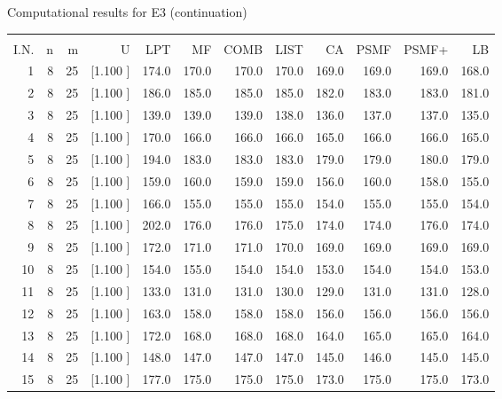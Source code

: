 \documentclass[12pt,a4paper]{article}
\begin{document}
\newpage
\begin{center}
 Computational results for E3 (continuation) {\tiny
\begin{tabular}{r r r r r r r r r r r r}\hline
    &   &   &          &        &        &        &        &        &        &        &       \\[-0.1in]
  I.N.  &  n  &  m  &  U  &  LPT  &  MF  &  COMB  &  LIST  &  CA  & PSMF &PSMF+ & LB \\[0.03in]
\hline
   1&  8& 25&[1.100     ]&   174.0&   170.0&   170.0&   170.0&   169.0&   169.0&   169.0&   168.0\\[-0.02in]
   2&  8& 25&[1.100     ]&   186.0&   185.0&   185.0&   185.0&   182.0&   183.0&   183.0&   181.0\\[-0.02in]
   3&  8& 25&[1.100     ]&   139.0&   139.0&   139.0&   138.0&   136.0&   137.0&   137.0&   135.0\\[-0.02in]
   4&  8& 25&[1.100     ]&   170.0&   166.0&   166.0&   166.0&   165.0&   166.0&   166.0&   165.0\\[-0.02in]
   5&  8& 25&[1.100     ]&   194.0&   183.0&   183.0&   183.0&   179.0&   179.0&   180.0&   179.0\\[-0.02in]
   6&  8& 25&[1.100     ]&   159.0&   160.0&   159.0&   159.0&   156.0&   160.0&   158.0&   155.0\\[-0.02in]
   7&  8& 25&[1.100     ]&   166.0&   155.0&   155.0&   155.0&   154.0&   155.0&   155.0&   154.0\\[-0.02in]
   8&  8& 25&[1.100     ]&   202.0&   176.0&   176.0&   175.0&   174.0&   174.0&   176.0&   174.0\\[-0.02in]
   9&  8& 25&[1.100     ]&   172.0&   171.0&   171.0&   170.0&   169.0&   169.0&   169.0&   169.0\\[-0.02in]
  10&  8& 25&[1.100     ]&   154.0&   155.0&   154.0&   154.0&   153.0&   154.0&   154.0&   153.0\\[-0.02in]
  11&  8& 25&[1.100     ]&   133.0&   131.0&   131.0&   130.0&   129.0&   131.0&   131.0&   128.0\\[-0.02in]
  12&  8& 25&[1.100     ]&   163.0&   158.0&   158.0&   158.0&   156.0&   156.0&   156.0&   156.0\\[-0.02in]
  13&  8& 25&[1.100     ]&   172.0&   168.0&   168.0&   168.0&   164.0&   165.0&   165.0&   164.0\\[-0.02in]
  14&  8& 25&[1.100     ]&   148.0&   147.0&   147.0&   147.0&   145.0&   146.0&   145.0&   145.0\\[-0.02in]
  15&  8& 25&[1.100     ]&   177.0&   175.0&   175.0&   175.0&   173.0&   175.0&   175.0&   173.0\\[-0.02in]

\end{tabular}}
\end{center}
\end{document}
